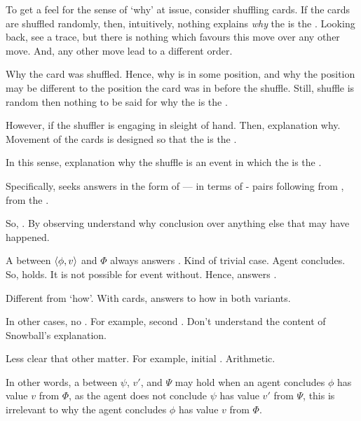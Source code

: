 \begin{note}
  \color{blue}
  To get a feel for the sense of `why' at issue, consider shuffling cards.
  If the cards are shuffled randomly, then, intuitively, nothing explains \emph{why} the \mainCard{} is the \mainCardPos{}.
  Looking back, see a trace, but there is nothing which favours this move over any other move.
  And, any other move lead to a different order.

  Why the card was shuffled.
  Hence, why is in some position, and why the position may be different to the position the card was in before the shuffle.
  Still, shuffle is random then nothing to be said for why the \mainCard{} is the \mainCardPos{}.

  However, if the shuffler is engaging in sleight of hand.
  Then, explanation why.
  Movement of the cards is designed so that the \mainCard{} is the \mainCardPos{}.

  In this sense, explanation why the shuffle is an event in which the \mainCard{} is the \mainCardPos{}.
\end{note}


\begin{note}
  Specifically, \qWhy{} seeks answers in the form of  --- in terms of - pairs following from \pool{}, from the \agpe{}.
\end{note}


\begin{note}
  So, \qWhy{}.
  By observing  understand why conclusion over anything else that may have happened.

  A \ros{} between \(\langle \phi, v \rangle\) and \(\Phi\) always answers \qWhy{}.
  Kind of trivial case.
  Agent concludes.
  So, \ros{} holds.
  It is not possible for event without.
  Hence, answers \qWhy{}.
\end{note}


\begin{note}
  Different from `how'.
  With cards, answers to how in both variants.
\end{note}


\begin{note}
  In other cases, no \ros{}.
  For example, second \scen{}.
  Don't understand the content of Snowball's explanation.

  Less clear that other \ros{} matter.
  For example, initial \scen{}.
  Arithmetic.

  In other words, a \ros{} between \(\psi\), \(v'\), and \(\Psi\) may hold when an agent concludes \(\phi\) has value \(v\) from \(\Phi\), as the agent does not conclude \(\psi\) has value \(v'\) from \(\Psi\), this \ros{} is irrelevant to why the agent concludes \(\phi\) has value \(v\) from \(\Phi\).
\end{note}


